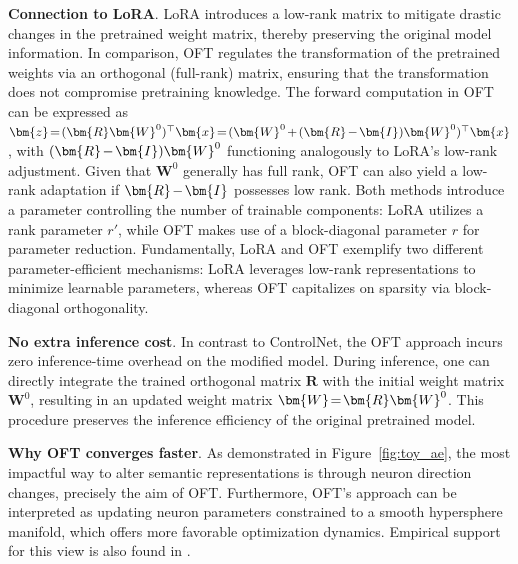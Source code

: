 \textbf{Connection to LoRA}. LoRA introduces a low-rank matrix to mitigate drastic changes in the pretrained weight matrix, thereby preserving the original model information. In comparison, OFT regulates the transformation of the pretrained weights via an orthogonal (full-rank) matrix, ensuring that the transformation does not compromise pretraining knowledge. The forward computation in OFT can be expressed as $\thickmuskip=2mu \medmuskip=2mu \bm{z}=(\bm{R}\bm{W}^0)^\top\bm{x}=(\bm{W}^0+(\bm{R}-\bm{I})\bm{W}^0)^\top\bm{x}$, with $\thickmuskip=2mu \medmuskip=2mu (\bm{R}-\bm{I})\bm{W}^0$ functioning analogously to LoRA’s low-rank adjustment. Given that $\bm{W}^0$ generally has full rank, OFT can also yield a low-rank adaptation if $\thickmuskip=2mu \medmuskip=2mu \bm{R}-\bm{I}$ possesses low rank. Both methods introduce a parameter controlling the number of trainable components: LoRA utilizes a rank parameter $r'$, while OFT makes use of a block-diagonal parameter $r$ for parameter reduction. Fundamentally, LoRA and OFT exemplify two different parameter-efficient mechanisms: LoRA leverages low-rank representations to minimize learnable parameters, whereas OFT capitalizes on sparsity via block-diagonal orthogonality.

\textbf{No extra inference cost}. In contrast to ControlNet, the OFT approach incurs zero inference-time overhead on the modified model. During inference, one can directly integrate the trained orthogonal matrix $\bm{R}$ with the initial weight matrix $\bm{W}^0$, resulting in an updated weight matrix $\thickmuskip=2mu \medmuskip=2mu \bm{W}=\bm{R}\bm{W}^0$. This procedure preserves the inference efficiency of the original pretrained model.

\textbf{Why OFT converges faster}. As demonstrated in Figure~\ref{fig:toy_ae}, the most impactful way to alter semantic representations is through neuron direction changes, precisely the aim of OFT. Furthermore, OFT's approach can be interpreted as updating neuron parameters constrained to a smooth hypersphere manifold, which offers more favorable optimization dynamics. Empirical support for this view is also found in \cite{liu2021orthogonal}.

